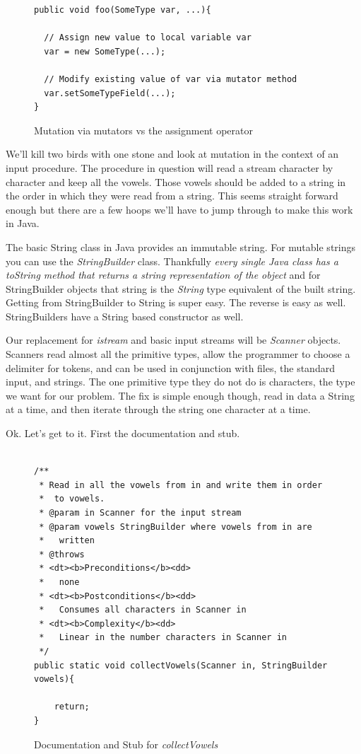 \documentclass[]{tufte-handout}
\begin{document}
\begin{figure}
\begin{lstlisting}
public void foo(SomeType var, ...){

  // Assign new value to local variable var
  var = new SomeType(...);

  // Modify existing value of var via mutator method
  var.setSomeTypeField(...);
}
\end{lstlisting}
\label{fig:mutatable}
\caption{Mutation via mutators vs the assignment operator}
\end{figure}

We'll kill two birds with one stone and look at mutation in the context of an input procedure. The procedure in question will read a stream character by character and keep all the vowels. Those vowels should be added to a string in the order in which they were read from a string. This seems straight forward enough but there are a few hoops we'll have to jump through to make this work in Java.

The basic String class in Java provides an immutable string. For mutable strings you can use the \textit{StringBuilder}  class. Thankfully \textit{every single Java class has a \textit{toString} method that returns a string representation of the object} and for StringBuilder objects that string is the \textit{String} type equivalent of the built string. Getting from StringBuilder to String is super easy. The reverse is easy as well. StringBuilders have a String based constructor as well.

Our replacement for \textit{istream} and basic input streams will be \textit{Scanner} objects. Scanners read almost all the primitive types, allow the programmer to choose a delimiter for tokens, and can be used in conjunction with files, the standard input, and strings. The one primitive type they do not do is characters, the type we want for our problem. The fix is simple enough though, read in data a String at a time, and then iterate through the string one character at a time.

Ok. Let's get to it. First the documentation and stub.

\begin{figure}
\begin{lstlisting}

/**
 * Read in all the vowels from in and write them in order
 *  to vowels.
 * @param in Scanner for the input stream
 * @param vowels StringBuilder where vowels from in are
 *   written
 * @throws
 * <dt><b>Preconditions</b><dd>
 *   none
 * <dt><b>Postconditions</b><dd>
 *   Consumes all characters in Scanner in
 * <dt><b>Complexity</b><dd>
 *   Linear in the number characters in Scanner in
 */
public static void collectVowels(Scanner in, StringBuilder vowels){

	return;
}

\end{lstlisting}
\label{fig:vowelsdox}
\caption{Documentation and Stub for \textit{collectVowels}}
\end{figure}
\end{document}
